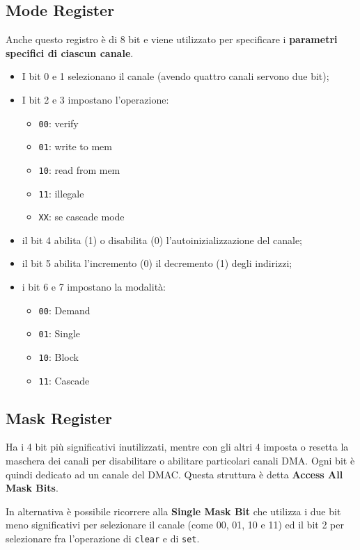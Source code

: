 \documentclass[11pt]{book}
\begin{document}
\subsection{Mode Register}

Anche questo registro \`e di 8 bit e viene utilizzato per specificare
i \textbf{parametri specifici di ciascun canale}.

\begin{itemize}
\item I bit 0 e 1 selezionano il canale (avendo quattro canali servono
  due bit);
\item I bit 2 e 3 impostano l'operazione:
  \begin{itemize}
  \item \texttt{00}: verify
  \item \texttt{01}: write to mem
  \item \texttt{10}: read from mem
  \item \texttt{11}: illegale
  \item \texttt{XX}: se cascade mode
  \end{itemize}
\item il bit 4 abilita (1) o disabilita (0) l'autoinizializzazione del
  canale;
\item il bit 5 abilita l'incremento (0) il decremento (1) degli
  indirizzi;
\item i bit 6 e 7 impostano la modalit\`a:
\begin{itemize}
\item \texttt{00}: Demand
\item \texttt{01}: Single
\item \texttt{10}: Block
\item \texttt{11}: Cascade
\end{itemize}
\end{itemize}

\subsection{Mask Register}

Ha i 4 bit pi\`u significativi inutilizzati, mentre con gli altri 4
imposta o resetta la maschera dei canali per disabilitare o abilitare
particolari canali DMA. Ogni bit \`e quindi dedicato ad un canale del
DMAC. Questa struttura \`e detta \textbf{Access All Mask Bits}.

In alternativa \`e possibile ricorrere alla \textbf{Single Mask Bit}
che utilizza i due bit meno significativi per selezionare il canale
(come 00, 01, 10 e 11) ed il bit 2 per selezionare fra l'operazione di
\texttt{clear} e di \texttt{set}.
\end{document}
